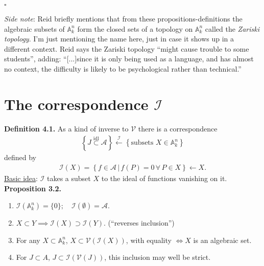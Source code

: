 \documentclass[12pt]{article}
\newcommand{\lc}{\left\{}
\newcommand{\rc}{\right\}}
\begin{document}
\hfill $\square$





\textit{Side note}: Reid briefly mentions that from these propositions-definitions the algebraic subsets of $\mathbb{A}^n_k$ form the closed sets of a topology on $\mathbb{A}^n_k$ called the \textit{Zariski topology}. I'm just mentioning the name here, just in case it shows up in a different context. Reid says the Zariski topology ``might cause trouble to some students'', adding:  ``[...]since it is only being used as a language, and has almost no context, the difficulty is likely to be psychological rather than technical.''










\newpage


\section{The correspondence $\mathcal{I}$}


\textbf{Definition 4.1.} As a kind of inverse to $\mathcal{V}$ there is a correspondence 
\begin{align*}
\lc J \overset{\text{idl}}{\subset} \mathcal{A} \rc \xleftarrow{\mathcal{I}} \lc \text{subsets } X \in \mathbb{A}^n_k \rc
\end{align*}
defined by
\begin{align*}
\mathcal{I}(X) = \lc f \in \mathcal{A} \,\vert\, f(P) = 0\,\forall\, P \in X \rc \leftarrow X.
\end{align*}
\underline{Basic idea}: $\mathcal{I}$ takes a subset $X$ to the ideal of functions vanishing on it. \\

\noindent \textbf{Proposition 3.2.} 
\begin{enumerate}
	\item $\mathcal{I}(\mathbb{A}^n_k) = \{0\}; \quad \mathcal{I}(\emptyset) = \mathcal{A}$. 
	\item $X \subset Y \implies \mathcal{I}(X) \supset \mathcal{I}(Y)$. (``reverses inclusion'')
	\item For any $X \subset \mathbb{A}^n_k$, $X \subset \mathcal{V}(\mathcal{I}(X))$, with equality $\iff X$ is an algebraic set.
	\item For $J \subset A$, $J \subset \mathcal{I}(\mathcal{V}(J))$, this inclusion may well be strict.   
\end{enumerate} 
\end{document}
